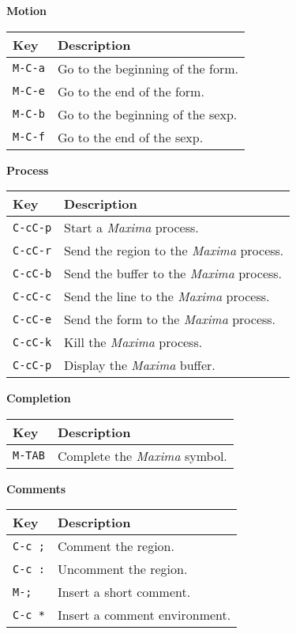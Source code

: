 \documentclass{article}
\newcommand{\mx}{\textsl{\sffamily Maxima}}
\begin{document}
\smallskip

\noindent
\textbf{Motion}

\smallskip

\noindent
\begin{tabular}{p{\firstcol}p{\secondcol}}
\hline
\textbf{Key} & \textbf{Description}\\
\hline
\texttt{M-C-a} & Go to the beginning of the form.\\
\texttt{M-C-e} & Go to the end of the form.\\
\texttt{M-C-b} & Go to the beginning of the sexp.\\
\texttt{M-C-f} & Go to the end of the sexp.
\end{tabular}

\smallskip

\noindent
\textbf{Process}

\smallskip

\noindent
\begin{tabular}{p{\firstcol}p{\secondcol}}
\hline
\textbf{Key} & \textbf{Description}\\
\hline
\texttt{C-cC-p} & Start a \mx{} process.\\
\texttt{C-cC-r} & Send the region to the \mx{} process.\\
\texttt{C-cC-b} & Send the buffer to the \mx{} process.\\
\texttt{C-cC-c} & Send the line to the \mx{} process.\\
\texttt{C-cC-e} & Send the form to the \mx{} process.\\
\texttt{C-cC-k} & Kill the \mx{} process.\\
\texttt{C-cC-p} & Display the \mx{} buffer.
\end{tabular}

\smallskip

\noindent
\textbf{Completion}

\smallskip

\noindent
\begin{tabular}{p{\firstcol}p{\secondcol}}
\hline
\textbf{Key} & \textbf{Description}\\
\hline
\texttt{M-TAB} & Complete the \mx{} symbol.\\
\end{tabular}

\smallskip

\noindent
\textbf{Comments}

\smallskip

\noindent
\begin{tabular}{p{\firstcol}p{\secondcol}}
\hline
\textbf{Key} & \textbf{Description}\\
\hline
\texttt{C-c ;} & Comment the region.\\
\texttt{C-c :} & Uncomment the region.\\
\texttt{M-;} & Insert a short comment.\\
\texttt{C-c *} & Insert a comment environment.
\end{tabular}
\end{document}
